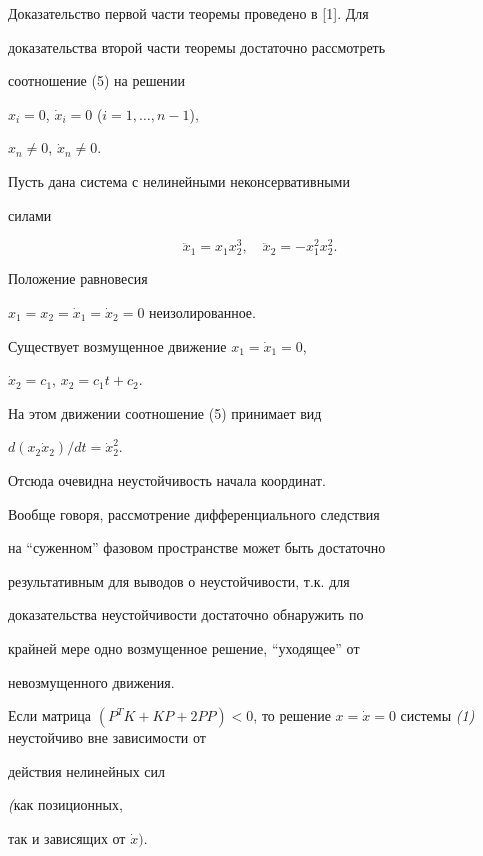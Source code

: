 Доказательство первой части теоремы проведено в [1]. Для


доказательства второй части теоремы достаточно рассмотреть


соотношение (5) на решении


$x_{i}=0$, $\Dot{x}_{i}=0$ ($i=1,\dotsc,n-1$),


$x_{n}\ne {0}$, $\Dot{x}_{n}\ne{0}$.





\begin{exam} Пусть дана система с нелинейными неконсервативными


силами


$$


\ddot{x}_{1}= x_{1}x_{2}^{3}, \quad \ddot{x}_{2}=


- x_{1}^{2}x_{2}^{2}.


$$


Положение равновесия


$x_{1}=x_{2}=\Dot{x}_{1}=\Dot{x}_{2}=0$ неизолированное.


Существует возмущенное движение $x_{1}=\Dot{x}_{1}=0$,


$\Dot{x}_{2}=c_{1}$, $x_{2}=c_{1}t+c_{2}$.


На этом движении соотношение (5) принимает вид


$d(x_{2} \Dot{x}_{2})/{dt}= \Dot{x}_{2}^{2}.$


Отсюда очевидна неустойчивость начала координат.


\end{exam}





Вообще говоря, рассмотрение дифференциального следствия


на ``суженном'' фазовом пространстве может быть достаточно


результативным для выводов о неустойчивости, т.к. для


доказательства неустойчивости достаточно обнаружить по


крайней мере одно возмущенное решение, ``уходящее'' от


невозмущенного движения.





\begin{thm} Если матрица $(P^{T}K+KP+2PP)<0$, то решение $x=


\Dot{x}=0$ системы {\em (1)} неустойчиво вне зависимости от


действия нелинейных сил


{\em (}как позиционных,


так и зависящих от $\Dot x)$.


\end{thm}





